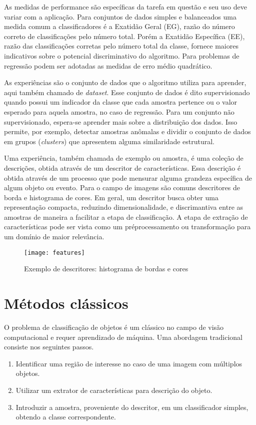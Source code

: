 As medidas de performance são específicas da tarefa em questão e seu uso deve variar com a aplicação. Para conjuntos de dados simples e balanceados uma medida comum a classificadores é a Exatidão Geral (EG), razão do número correto de classificações pelo número total. Porém a Exatidão Específica (EE), razão das classificações corretas pelo número total da classe, fornece maiores indicativos sobre o potencial discriminativo do algoritmo. Para problemas de regressão podem ser adotadas as medidas de erro médio quadrático.

As experiências são o conjunto de dados que o algoritmo utiliza para aprender, aqui também chamado de \textit{dataset}. Esse conjunto de dados é dito supervisionado quando possui um indicador da classe que cada amostra pertence ou o valor esperado para aquela amostra, no caso de regressão. Para um conjunto não supervisionado, espera-se aprender mais sobre a distribuição dos dados. Isso permite, por exemplo, detectar amostras anômalas e dividir o conjunto de dados em grupos (\textit{clusters}) que apresentem alguma similaridade estrutural.

Uma experiência, também chamada de exemplo ou amostra, é uma coleção de descrições, obtida através de um descritor de características. Essa descrição é obtida através de um processo que pode mensurar alguma grandeza específica de algum objeto ou evento. Para o campo de imagens são comuns descritores de borda e histograma de cores. Em geral, um descritor busca obter uma representação compacta, reduzindo dimensionalidade, e discrimantiva entre as amostras de maneira a facilitar a etapa de classificação. A etapa de extração de características pode ser vista como um préprocessamento ou transformação para um domínio de maior relevância.

\begin{figure}[h]
\caption{Exemplo de descritores: histograma de bordas e cores}
\centering
\texttt{[image: features]}
\label{fig:features}
\end{figure}

\section{Métodos clássicos}
O problema de classificação de objetos é um clássico no campo de visão computacional e requer aprendizado de máquina. Uma abordagem tradicional consiste nos seguintes passos.
	\begin{enumerate}
	\item Identificar uma região de interesse no caso de uma imagem com múltiplos objetos.
	\item Utilizar um extrator de características para descrição do objeto.
	\item Introduzir a amostra, proveniente do descritor, em um classificador simples, obtendo a classe correspondente.
	\end{enumerate}

